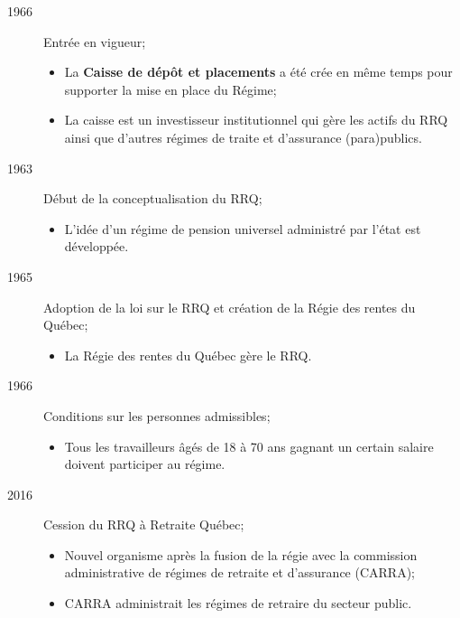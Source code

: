 \documentclass[10pt, french]{article}
\begin{document}
\begin{multicols*}{3}
\begin{rappel_enhanced}
\begin{description}
	\item[1966]	Entrée en vigueur;
		\begin{itemize}[leftmargin = *]
		\item	La \textbf{Caisse de dépôt et placements} a été crée en même temps pour supporter la mise en place du Régime;
		\item	La caisse est un investisseur institutionnel qui gère les actifs du RRQ ainsi que d'autres régimes de traite et d'assurance (para)publics.
		\end{itemize}
	\item[1963]	Début de la conceptualisation du RRQ;
		\begin{itemize}[leftmargin = *]
		\item	L'idée d'un régime de pension universel administré par l'état est développée.
		\end{itemize}
	\item[1965]	Adoption de la loi sur le RRQ et création de la Régie des rentes du Québec;
		\begin{itemize}[leftmargin = *]
		\item	La Régie des rentes du Québec gère le RRQ.
		\end{itemize}
	\item[1966]	Conditions sur les personnes admissibles;
		\begin{itemize}[leftmargin = *]
		\item	Tous les travailleurs âgés de 18 à 70 ans gagnant un certain salaire doivent participer au régime.
		\end{itemize}
	\item[2016]	Cession du RRQ à Retraite Québec;
		\begin{itemize}[leftmargin = *]
		\item	Nouvel organisme après la fusion de la régie avec la commission administrative de régimes de retraite et d'assurance (CARRA);
		\item	CARRA administrait les régimes de retraire du secteur public.
		\end{itemize}
\end{description}
\end{rappel_enhanced}


\end{multicols*}
\end{document}
